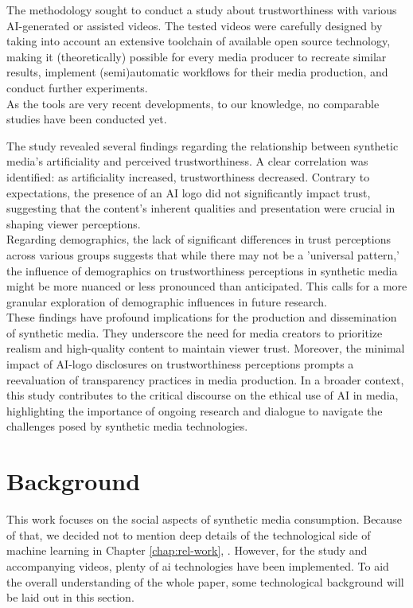\documentclass[
  a4paper,  %
  twoside,  %
  bibliography=totoc,
  headsepline,
  cleardoublepage=empty,
  parskip=half,
  draft=false
]{scrbook}
\begin{document}
The methodology sought to conduct a study about trustworthiness with various AI-generated or assisted videos.
The tested videos were carefully designed by taking into account an extensive toolchain of available open source technology, making it (theoretically) possible for every media producer to recreate similar results, implement (semi)automatic workflows for their media production, and conduct further experiments. \\
As the tools are very recent developments, to our knowledge, no comparable studies have been conducted yet.

The study revealed several findings regarding the relationship between synthetic media's artificiality and perceived trustworthiness. A clear correlation was identified: as artificiality increased, trustworthiness decreased. Contrary to expectations, the presence of an AI logo did not significantly impact trust, suggesting that the content's inherent qualities and presentation were crucial in shaping viewer perceptions. \\
Regarding demographics, the lack of significant differences in trust perceptions across various groups suggests that while there may not be a 'universal pattern,' the influence of demographics on trustworthiness perceptions in synthetic media might be more nuanced or less pronounced than anticipated. This calls for a more granular exploration of demographic influences in future research. \\
These findings have profound implications for the production and dissemination of synthetic media. They underscore the need for media creators to prioritize realism and high-quality content to maintain viewer trust. Moreover, the minimal impact of AI-logo disclosures on trustworthiness perceptions prompts a reevaluation of transparency practices in media production. In a broader context, this study contributes to the critical discourse on the ethical use of AI in media, highlighting the importance of ongoing research and dialogue to navigate the challenges posed by synthetic media technologies.
\chapter{Background}
\label{chap:background}
This work focuses on the social aspects of synthetic media consumption. Because of that, we decided not to mention deep details of the technological side of machine learning in Chapter \ref{chap:rel-work}, . However, for the study and accompanying videos, plenty of \gls{ai} technologies have been implemented. To aid the overall understanding of the whole paper, some technological background will be laid out in this section.
\end{document}
